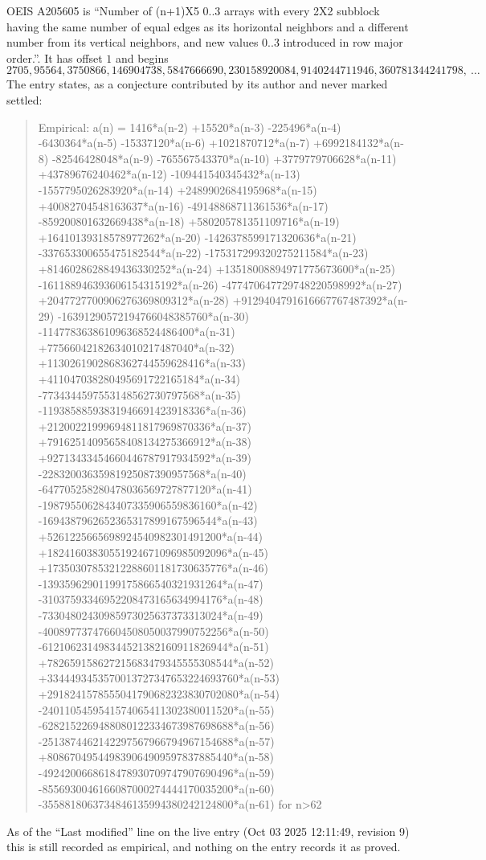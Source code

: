 \documentclass[11pt,a4paper]{article}
\theoremstyle{plain}
\theoremstyle{definition}
\begin{document}
OEIS A205605 is ``Number of (n+1)X5 0..3 arrays with every 2X2 subblock having the same number of equal edges as its horizontal neighbors and a different number from its vertical neighbors, and new values 0..3 introduced in row major order.''. It has offset $1$ and begins
\[
2705, 95564, 3750866, 146904738, 5847666690, 230158920084, 9140244711946, 360781344241798,\ \dots
\]
The entry states, as a conjecture contributed by its author and never marked settled:
\begin{quote}
Empirical: a(n) = 1416*a(n-2) +15520*a(n-3) -225496*a(n-4) -6430364*a(n-5) -15337120*a(n-6) +1021870712*a(n-7) +6992184132*a(n-8) -82546428048*a(n-9) -765567543370*a(n-10) +3779779706628*a(n-11) +43789676240462*a(n-12) -109441540345432*a(n-13) -1557795026283920*a(n-14) +2489902684195968*a(n-15) +40082704548163637*a(n-16) -49148868711361536*a(n-17) -859200801632669438*a(n-18) +580205781351109716*a(n-19) +16410139318578977262*a(n-20) -1426378599171320636*a(n-21) -337653300655475182544*a(n-22) -175317299320275211584*a(n-23) +8146028628849436330252*a(n-24) +13518008894971775673600*a(n-25) -161188946393606154315192*a(n-26) -477470647729748220598992*a(n-27) +2047727700906276369809312*a(n-28) +9129404791616667767487392*a(n-29) -16391290572194766048385760*a(n-30) -114778363861096368524486400*a(n-31) +77566042182634010217487040*a(n-32) +1130261902868362744559628416*a(n-33) +411047038280495691722165184*a(n-34) -7734344597553148562730797568*a(n-35) -11938588593831946691423918336*a(n-36) +21200221999694811817969870336*a(n-37) +79162514095658408134275366912*a(n-38) +92713433454660446787917934592*a(n-39) -22832003635981925087390957568*a(n-40) -647705258280478036569727877120*a(n-41) -1987955062843407335906559836160*a(n-42) -1694387962652365317899167596544*a(n-43) +5261225665698924540982301491200*a(n-44) +18241603830551924671096985092096*a(n-45) +17350307853212288601181730635776*a(n-46) -13935962901199175866540321931264*a(n-47) -31037593346952208473165634994176*a(n-48) -73304802430985973025637373313024*a(n-49) -400897737476604508050037990752256*a(n-50) -612106231498344521382160911826944*a(n-51) +782659158627215683479345555308544*a(n-52) +3344493453570013727347653224693760*a(n-53) +2918241578555041790682323830702080*a(n-54) -2401105459541574065411302380011520*a(n-55) -6282152269488080122334673987698688*a(n-56) -2513874462142297567966794967154688*a(n-57) +808670495449839064909597837885440*a(n-58) -4924200668618478930709747907690496*a(n-59) -8556930046166087000274444170035200*a(n-60) -3558818063734846135994380242124800*a(n-61) for n>62
\end{quote}
As of the ``Last modified'' line on the live entry (Oct 03 2025 12:11:49, revision 9) this is still
recorded as empirical, and nothing on the entry records it as proved.
\end{document}
